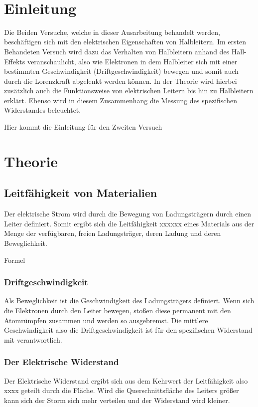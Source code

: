 \documentclass[a4paper]{scrartcl}
\def\header#1#2{
  \begin{center}
    {\Large #1}\\
    {#2}
  \end{center}
}
\numberwithin{equation}{subsection}
\begin{document}
\vspace{10pt}
\header{\HEADDING}{\SUBHEADDING}

\tableofcontents

\newpage

\section{Einleitung}
Die Beiden Versuche, welche in dieser Ausarbeitung behandelt werden, beschäftigen sich mit den elektrischen Eigenschaften von Halbleitern. Im ersten Behandeten Versuch wird dazu das Verhalten von Halbleitern anhand des Hall-Effekts veranschaulicht, also wie Elektronen in dem Halbleiter sich mit einer bestimmten Geschwindigkeit (Driftgeschwindigkeit) bewegen und somit auch durch die Lorenzkraft abgelenkt werden können. In der Theorie wird hierbei zusätzlich auch die Funktionsweise von elektrischen Leitern bis hin zu Halbleitern erklärt.
Ebenso wird in diesem Zusammenhang die Messung des spezifischen Widerstandes beleuchtet.

Hier kommt die Einleitung für den Zweiten Versuch

\newpage

\section{Theorie}
\subsection{Leitfähigkeit von Materialien}

Der elektrische Strom wird durch die Bewegung von Ladungsträgern durch einen Leiter definiert.
Somit ergibt sich die Leitfähigkeit xxxxxx eines Materials aus der Menge der verfügbaren, freien Ladungsträger, deren Ladung und deren Beweglichkeit.

Formel

\subsubsection{Driftgeschwindigkeit}
Als Beweglichkeit ist die Geschwindigkeit des Ladungsträgers definiert. Wenn sich die Elektronen durch den Leiter bewegen, stoßen diese permanent mit den Atomrümpfen zusammen und werden so ausgebremst. Die mittlere Geschwindigkeit also die Driftgeschwindigkeit ist für den spezifischen Widerstand mit verantwortlich.

\subsubsection{Der  Elektrische Widerstand}
Der Elektrische Widerstand ergibt sich aus dem Kehrwert der Leitfähigkeit also xxxx geteilt durch die Fläche.
Wird die Querschnittsfläche des Leiters größer kann sich der Storm sich mehr verteilen und der Widerstand wird kleiner.
\end{document}
